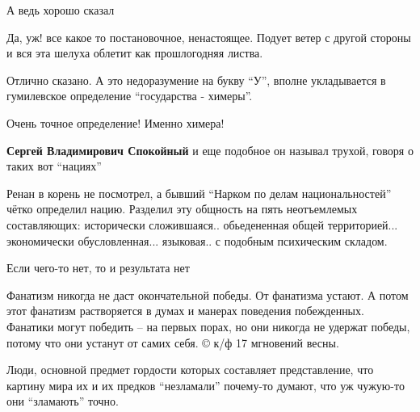  
 
 
 
 
\zzSecCmt

\begin{itemize} %
А ведь хорошо сказал

Да, уж! все какое то постановочное, ненастоящее. Подует ветер с другой стороны и вся эта шелуха облетит как прошлогодняя листва.

Отлично сказано.
А это недоразумение на букву \enquote{У}, вполне укладывается в гумилевское определение \enquote{государства - химеры}.

\begin{itemize} %
Очень точное определение! Именно химера!

\textbf{Сергей Владимирович Спокойный} и еще подобное он называл трухой, говоря о таких вот \enquote{нациях}
\end{itemize} %


Ренан в корень не посмотрел, а бывший \enquote{Нарком по делам национальностей} чётко
определил нацию. Разделил эту общность на пять неотъемлемых составляющих:
исторически сложившаяся.. обьедененная общей территорией... экономически
обусловленная... языковая.. с подобным психическим складом.

Если чего-то нет, то и результата нет


Фанатизм никогда не даст окончательной победы. От фанатизма устают. А потом
этот фанатизм растворяется в думах и манерах поведения побежденных. Фанатики
могут победить – на первых порах, но они никогда не удержат победы, потому что
они устанут от самих себя. © к/ф 17 мгновений весны.


Люди, основной предмет гордости которых составляет представление, что картину
мира их и их предков \enquote{незламали} почему-то думают, что уж чужую-то они
\enquote{зламають} точно.



\end{itemize}
